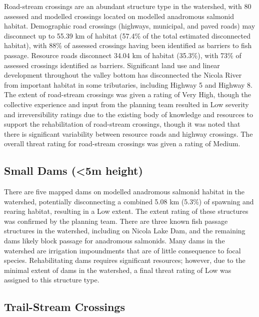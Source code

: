 \documentclass[
  letterpaper,
  DIV=11,
  numbers=noendperiod]{scrreprt}
\begin{document}
Road-stream crossings are an abundant structure type in the watershed,
with 80 assessed and modelled crossings located on modelled anadromous
salmonid habitat. Demographic road crossings (highways, municipal, and
paved roads) may disconnect up to 55.39 km of habitat (57.4\% of the
total estimated disconnected habitat), with 88\% of assessed crossings
having been identified as barriers to fish passage. Resource roads
disconnect 34.04 km of habitat (35.3\%), with 73\% of assessed crossings
identified as barriers. Significant land use and linear development
throughout the valley bottom has disconnected the Nicola River from
important habitat in some tributaries, including Highway 5 and Highway
8. The extent of road-stream crossings was given a rating of Very High,
though the collective experience and input from the planning team
resulted in Low severity and irreversibility ratings due to the existing
body of knowledge and resources to support the rehabilitation of
road-stream crossings, though it was noted that there is significant
variability between resource roads and highway crossings. The overall
threat rating for road-stream crossings was given a rating of Medium.

\hypertarget{small-dams-5m-height}{%
\subsection*{Small Dams (\textless5m
height)}\label{small-dams-5m-height}}

There are five mapped dams on modelled anadromous salmonid habitat in
the watershed, potentially disconnecting a combined 5.08 km (5.3\%) of
spawning and rearing habitat, resulting in a Low extent. The extent
rating of these structures was confirmed by the planning team. There are
three known fish passage structures in the watershed, including on
Nicola Lake Dam, and the remaining dams likely block passage for
anadromous salmonids. Many dams in the watershed are irrigation
impoundments that are of little consequence to focal species.
Rehabilitating dams requires significant resources; however, due to the
minimal extent of dams in the watershed, a final threat rating of Low
was assigned to this structure type.

\hypertarget{trail-stream-crossings}{%
\subsection*{Trail-Stream Crossings}\label{trail-stream-crossings}}
\end{document}
